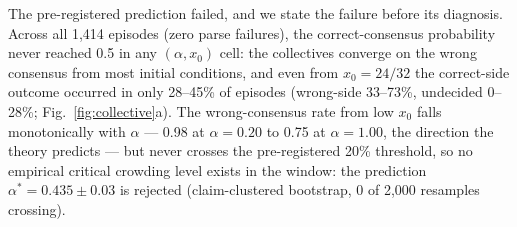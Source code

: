 \documentclass[11pt]{article}
\newcommand{\astar}{\alpha^{*}}
\begin{document}
The pre-registered prediction failed, and we state the failure before its
diagnosis. Across all 1{,}414 episodes (zero parse failures), the
correct-consensus probability never reached 0.5 in any $(\alpha, x_0)$ cell:
the collectives converge on the wrong consensus from most initial conditions,
and even from $x_0 = 24/32$ the correct-side outcome occurred in only
28--45\% of episodes (wrong-side 33--73\%, undecided 0--28\%;
Fig.~\ref{fig:collective}a). The
wrong-consensus rate from low $x_0$ falls monotonically with $\alpha$ --- 0.98
at $\alpha = 0.20$ to 0.75 at $\alpha = 1.00$, the direction the theory
predicts --- but never crosses the pre-registered 20\% threshold, so no
empirical critical crowding level exists in the window: the prediction
$\astar = 0.435 \pm 0.03$ is rejected (claim-clustered bootstrap, 0 of 2{,}000
resamples crossing).
\end{document}

